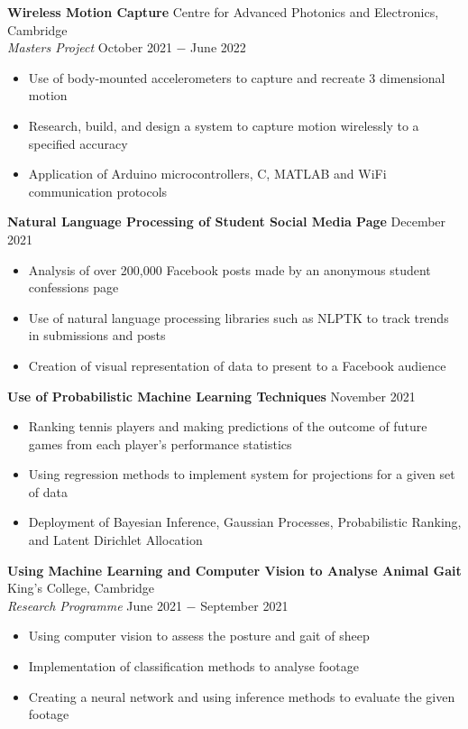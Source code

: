 \documentclass{article}
\begin{document}
\textbf{Wireless Motion Capture} \hfill Centre for Advanced Photonics and Electronics, Cambridge\\
\textit{Masters Project} \hfill October 2021 $-$ June 2022
\begin{itemize}
    \item Use of body-mounted accelerometers to capture and recreate 3 dimensional motion
    \item Research, build, and design a system to capture motion wirelessly to a specified accuracy
    \item Application of Arduino microcontrollers, C, MATLAB and WiFi communication protocols
\end{itemize}\medskip

\textbf{Natural Language Processing of Student Social Media Page} \hfill December 2021
\begin{itemize}
    \item Analysis of over 200,000 Facebook posts made by an anonymous student confessions page
    \item Use of natural language processing libraries such as NLPTK to track trends in submissions and posts
    \item Creation of visual representation of data to present to a Facebook audience
\end{itemize}\medskip

\textbf{Use of Probabilistic Machine Learning Techniques} \hfill November 2021
\begin{itemize}
    \item Ranking tennis players and making predictions of the outcome of future games from each player's performance statistics
    \item Using regression methods to implement system for projections for a given set of data 
    \item Deployment of Bayesian Inference, Gaussian Processes, Probabilistic Ranking, and Latent Dirichlet Allocation
\end{itemize}\medskip

\textbf{Using Machine Learning and Computer Vision to Analyse Animal Gait} \hfill King's College, Cambridge \\
\textit{Research Programme} \hfill June 2021 $-$ September 2021
\begin{itemize}
\item {Using computer vision to assess the posture and gait of sheep}
\item Implementation of classification methods to analyse footage
\item {Creating a neural network and using inference methods to evaluate the given footage}
\end{itemize} \medskip
\end{document}
